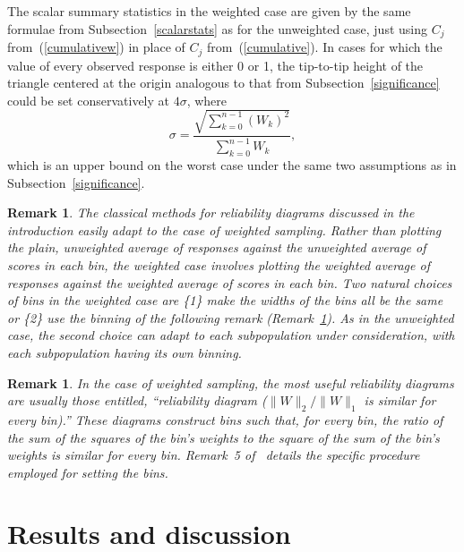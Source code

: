 \documentclass{article}
\newtheorem{remark1}[theorem]{Remark}
\newenvironment{remark}{\begin{remark1} \rm}{\end{remark1}}
\begin{document}
The scalar summary statistics in the weighted case are given
by the same formulae from Subsection~\ref{scalarstats}
as for the unweighted case, just using $C_j$ from~(\ref{cumulativew})
in place of $C_j$ from~(\ref{cumulative}).
In cases for which the value of every observed response is either 0 or 1,
the tip-to-tip height of the triangle centered at the origin
analogous to that from Subsection~\ref{significance}
could be set conservatively at $4\sigma$, where
%
\begin{equation}
\label{stddevw}
\sigma = \frac{\sqrt{\sum_{k=0}^{n-1} (W_k)^2}}{\sum_{k=0}^{n-1} W_k},
\end{equation}
%
which is an upper bound on the worst case under the same two assumptions
as in Subsection~\ref{significance}.


\begin{remark}
\label{weightedremark}
The classical methods for reliability diagrams discussed in the introduction
easily adapt to the case of weighted sampling.
Rather than plotting the plain, unweighted average of responses
against the unweighted average of scores in each bin,
the weighted case involves plotting the weighted average of responses
against the weighted average of scores in each bin.
Two natural choices of bins in the weighted case are
\{1\} make the widths of the bins all be the same or
\{2\} use the binning of the following remark (Remark~\ref{equierrs}).
As in the unweighted case, the second choice can adapt to each subpopulation
under consideration, with each subpopulation having its own binning.
\end{remark}


\begin{remark}
\label{equierrs}
In the case of weighted sampling, the most useful reliability diagrams
are usually those entitled,
``reliability diagram ($\|W\|_2/\|W\|_1$ is similar for every bin).''
These diagrams construct bins such that, for every bin,
the ratio of the sum of the squares of the bin's weights
to the square of the sum of the bin's weights is similar for every bin.
Remark~5 of~\cite{tygert} details the specific procedure employed
for setting the bins.
\end{remark}



\section{Results and discussion}
\label{results}
\end{document}
